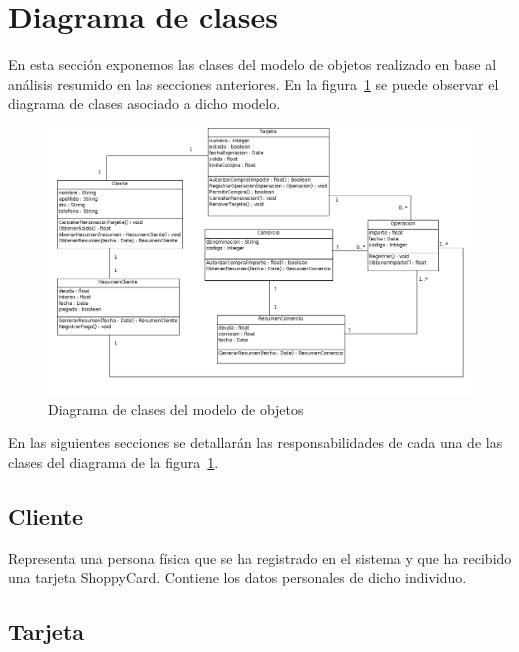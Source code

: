 \section{Diagrama de clases}

En esta sección exponemos las clases del modelo de objetos realizado en base
al análisis resumido en las secciones anteriores. En la 
figura~\ref{fig:modobjetos:diagramaclases} se puede observar el diagrama de 
clases asociado a dicho modelo.

\begin{figure}[htb]
\begin{center}
\includegraphics[width=\textwidth]{images/mod_objetos_clases.png}
\end{center}
\caption{Diagrama de clases del modelo de objetos}
\label{fig:modobjetos:diagramaclases}
\end{figure}

\FloatBarrier

En las siguientes secciones se detallarán las responsabilidades de cada una de
las clases del diagrama de la figura~\ref{fig:modobjetos:diagramaclases}.

\subsection{Cliente}

Representa una persona física que se ha registrado en el sistema y que ha
recibido una tarjeta ShoppyCard. Contiene los datos personales de dicho 
individuo.

\subsection{Tarjeta}

